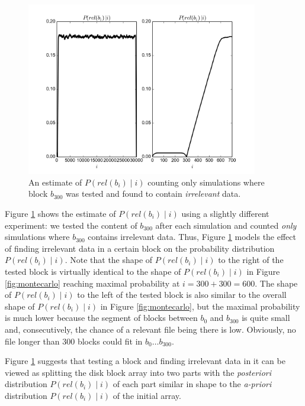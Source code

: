 \documentclass[10pt,a4paper]{article}
\begin{document}
\begin{figure}
  \centerline{\includegraphics[width=0.9\textwidth]{fig4_1}}
  \caption{An estimate of $P(rel(b_i) \mid i)$ counting only simulations where block $b_{300}$ was tested and found to contain \emph{irrelevant} data.}
  \label{fig:montecarlo-miss}
\end{figure}

Figure \ref{fig:montecarlo-miss} shows the estimate of $P(rel(b_i) \mid i)$ using a slightly different experiment: we tested the content of $b_{300}$ after each simulation and counted \emph{only} simulations where $b_{300}$ contains irrelevant data. Thus, Figure \ref{fig:montecarlo-miss} models the effect of finding irrelevant data in a certain block on the probability distribution $P(rel(b_i) \mid i)$. Note that the shape of $P(rel(b_i) \mid i)$ to the right of the tested block is virtually identical to the shape of $P(rel(b_i) \mid i)$ in Figure \ref{fig:montecarlo} reaching maximal probability at $i=300+300=600$. The shape of $P(rel(b_i) \mid i)$ to the left of the tested block is also similar to the overall shape of  $P(rel(b_i) \mid i)$ in Figure \ref{fig:montecarlo}, but the maximal probability is much lower because the segment of blocks between $b_0$ and $b_{300}$ is quite small and, consecutively, the chance of a relevant file being there is low. Obviously, no file longer than 300 blocks could fit in $b_0 \dots b_{300}$.

Figure \ref{fig:montecarlo-miss} suggests that testing a block and finding irrelevant data in it can be viewed as splitting the disk block array into two parts with the \emph{posteriori} distribution $P(rel(b_i) \mid i)$ of each part similar in shape to the \emph{a-priori} distribution $P(rel(b_i) \mid i)$ of the initial array. 
\end{document}
